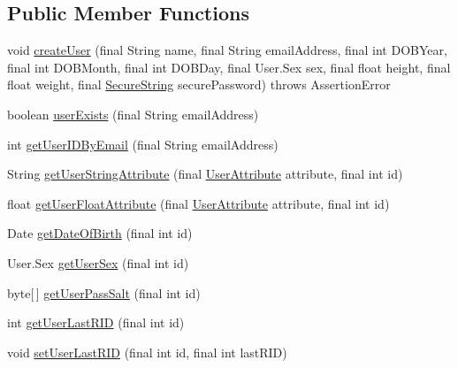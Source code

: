 \subsection*{Public Member Functions}
\begin{DoxyCompactItemize}
\item 
void \hyperlink{classcom_1_1activitytracker_1_1_d_b_manager_a39ef296348c7bfacf965b3417655f4e5}{create\+User} (final String name, final String email\+Address, final int D\+O\+B\+Year, final int D\+O\+B\+Month, final int D\+O\+B\+Day, final User.\+Sex sex, final float height, final float weight, final \hyperlink{classcom_1_1activitytracker_1_1_secure_string}{Secure\+String} secure\+Password)  throws Assertion\+Error 
\item 
boolean \hyperlink{classcom_1_1activitytracker_1_1_d_b_manager_af05d79f33ecf2920a67d1b9cf82c079f}{user\+Exists} (final String email\+Address)
\item 
int \hyperlink{classcom_1_1activitytracker_1_1_d_b_manager_a195dcdeabdd00facb19d720976dd3f53}{get\+User\+I\+D\+By\+Email} (final String email\+Address)
\item 
String \hyperlink{classcom_1_1activitytracker_1_1_d_b_manager_a20f726c054d6c8a6fc3ce629d87f1114}{get\+User\+String\+Attribute} (final \hyperlink{enumcom_1_1activitytracker_1_1_user_attribute}{User\+Attribute} attribute, final int id)
\item 
float \hyperlink{classcom_1_1activitytracker_1_1_d_b_manager_a98df66254bec4d74b29cfe468a9fc794}{get\+User\+Float\+Attribute} (final \hyperlink{enumcom_1_1activitytracker_1_1_user_attribute}{User\+Attribute} attribute, final int id)
\item 
Date \hyperlink{classcom_1_1activitytracker_1_1_d_b_manager_a0576baf67b45c7d2d0ba369052e4404e}{get\+Date\+Of\+Birth} (final int id)
\item 
User.\+Sex \hyperlink{classcom_1_1activitytracker_1_1_d_b_manager_a4e695c111b877cfd1d918602551f65a1}{get\+User\+Sex} (final int id)
\item 
byte\mbox{[}$\,$\mbox{]} \hyperlink{classcom_1_1activitytracker_1_1_d_b_manager_aeab864b072cc08c0521e80ae1f459ca7}{get\+User\+Pass\+Salt} (final int id)
\item 
int \hyperlink{classcom_1_1activitytracker_1_1_d_b_manager_aab14c61b3f3a17bdea10cab1b5fd9337}{get\+User\+Last\+R\+ID} (final int id)
\item 
void \hyperlink{classcom_1_1activitytracker_1_1_d_b_manager_a93b7fc4c2d0083e125852d84f087a8d3}{set\+User\+Last\+R\+ID} (final int id, final int last\+R\+ID)

\end{DoxyCompactItemize}
